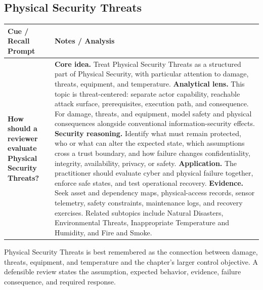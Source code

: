 \documentclass[11pt]{article}
\newcommand{\CornellHeader}{%
\rowcolor{Navy}\color{white}\bfseries Cue / Recall Prompt & \color{white}\bfseries Notes / Analysis\\\hline}
\newcommand{\CornellRow}[2]{%
\cellcolor{CueGray}\RaggedRight\textbf{#1} & \RaggedRight #2\\\hline}
\begin{document}
\subsection*{Physical Security Threats}
\begin{longtable}{>{\RaggedRight\arraybackslash}p{}|>{\RaggedRight\arraybackslash}p{}}
\CornellHeader
\CornellRow{How should a reviewer evaluate Physical Security Threats?}{\textbf{Core idea.} Treat Physical Security Threats as a structured part of Physical Security, with particular attention to damage, threats, equipment, and temperature. \textbf{Analytical lens.} This topic is threat-centered: separate actor capability, reachable attack surface, prerequisites, execution path, and consequence. For damage, threats, and equipment, model safety and physical consequences alongside conventional information-security effects. \textbf{Security reasoning.} Identify what must remain protected, who or what can alter the expected state, which assumptions cross a trust boundary, and how failure changes confidentiality, integrity, availability, privacy, or safety. \textbf{Application.} The practitioner should evaluate cyber and physical failure together, enforce safe states, and test operational recovery. \textbf{Evidence.} Seek asset and dependency maps, physical-access records, sensor telemetry, safety constraints, maintenance logs, and recovery exercises. Related subtopics include Natural Disasters, Environmental Threats, Inappropriate Temperature and Humidity, and Fire and Smoke.}
\end{longtable}
\begin{topicsummary}
Physical Security Threats is best remembered as the connection between damage, threats, equipment, and temperature and the chapter's larger control objective. A defensible review states the assumption, expected behavior, evidence, failure consequence, and required response.
\end{topicsummary}
\end{document}
